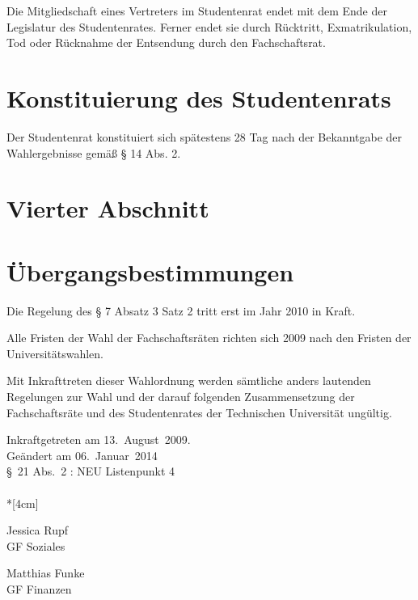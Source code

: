 \begin{multicols}{2}
\Abs \Satz Die Mitgliedschaft eines Vertreters im Studentenrat endet mit dem Ende der Legislatur des Studentenrates. Ferner endet sie durch Rücktritt, Exmatrikulation, Tod oder Rücknahme der Entsendung durch den Fachschaftsrat.

\section{Konstituierung des Studentenrats}
\Abs \Satz Der Studentenrat konstituiert sich spätestens 28 Tag nach der Bekanntgabe der Wahlergebnisse gemäß § 14 Abs. 2.

\section*{Vierter Abschnitt}
\section{Übergangsbestimmungen}
\Abs \Satz Die Regelung des § 7 Absatz 3 Satz 2 tritt erst im Jahr 2010 in Kraft.

\Abs \Satz Alle Fristen der Wahl der Fachschaftsräten richten sich 2009 nach den Fristen der Universitätswahlen.

\Abs \Satz Mit Inkrafttreten dieser Wahlordnung werden sämtliche anders lautenden Regelungen zur Wahl und der darauf folgenden Zusammensetzung der Fachschaftsräte und des Studentenrates der Technischen Universität ungültig.
\end{multicols}
\nopagebreak
\vspace{1cm}
Inkraftgetreten am 13.~August~2009.
\\ 
  

\footnotesize
Geändert am 06.~Januar~2014\\
§~21 Abs.~2 : NEU Listenpunkt 4\\

\normalsize
~\\*[4cm]
\begin{center}
\hspace*{\fill}
\parbox{7cm}{Jessica Rupf\\GF Soziales}
\hfill\parbox{7cm}{Matthias Funke\\GF Finanzen}
\hspace*{\fill}
\end{center}     
